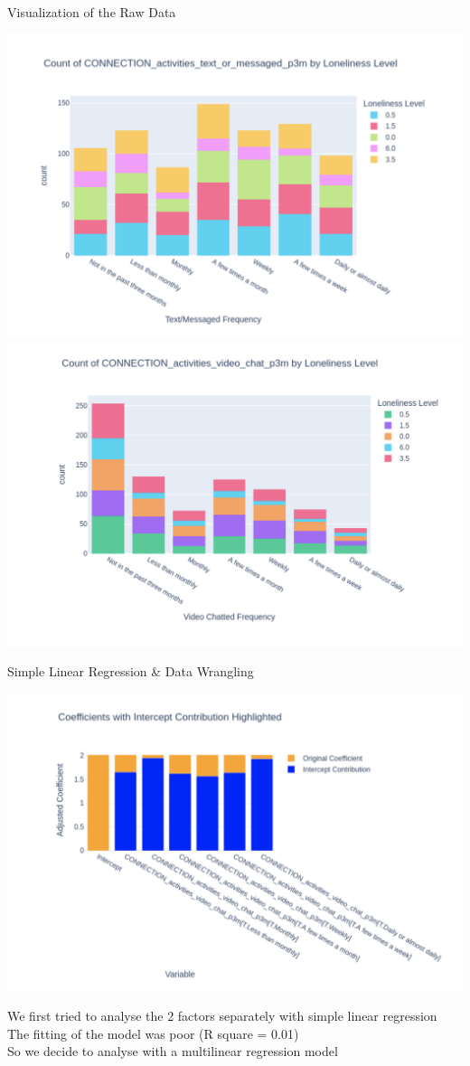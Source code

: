 \documentclass{beamer}
\begin{document}
\begin{frame}{Visualization of the Raw Data}


\includegraphics[width=0.5\linewidth]{presentation/Screenshot 2024-11-28 at 12.28.29 PM.png}
\includegraphics[width=0.5\linewidth]{presentation/Screenshot 2024-11-28 at 12.31.04 PM.png}


\end{frame}

\begin{frame}{Simple Linear Regression & Data Wrangling}

\includegraphics[width=0.5\linewidth]{presentation/Screenshot 2024-11-28 at 12.32.21 PM.png}

We first tried to analyse the 2 factors separately with simple linear regression\\
The fitting of the model was poor (R square = 0.01)\\
So we decide to analyse with a  multilinear regression model\\
\end{frame}
\end{document}
